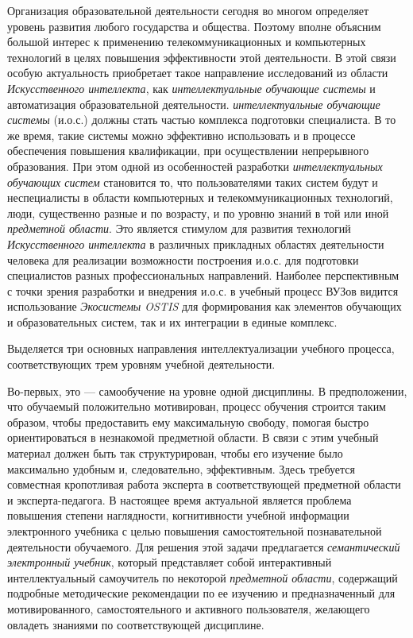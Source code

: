 Организация образовательной деятельности сегодня во многом определяет уровень развития любого государства и общества. Поэтому вполне объясним большой интерес к применению телекоммуникационных и компьютерных технологий в целях повышения эффективности этой деятельности. В этой связи особую актуальность приобретает такое направление исследований из области \textit{Искусственного интеллекта}, как \textit{интеллектуальные обучающие системы} и автоматизация образовательной деятельности. \textit{интеллектуальные обучающие системы} (и.о.с.) должны стать частью комплекса подготовки специалиста. В то же время, такие системы можно эффективно использовать и в процессе обеспечения повышения квалификации, при осуществлении непрерывного образования. При этом одной из особенностей разработки \textit{интеллектуальных обучающих систем} становится то, что пользователями таких систем будут и неспециалисты в области компьютерных и телекоммуникационных технологий, люди, существенно разные и по возрасту, и по уровню знаний в той или иной \textit{предметной области}. Это является стимулом для развития технологий \textit{Искусственного интеллекта} в различных прикладных областях деятельности человека для реализации возможности построения и.о.с. для подготовки специалистов разных профессиональных направлений. Наиболее перспективным с точки зрения разработки и внедрения и.о.с. в учебный процесс ВУЗов видится использование \textit{Экосистемы OSTIS} для формирования как элементов обучающих и образовательных систем, так и их интеграции в единые комплекс.

Выделяется три основных направления интеллектуализации учебного процесса, соответствующих трем уровням учебной деятельности.

Во-первых, это --- самообучение на уровне одной дисциплины. В предположении, что обучаемый положительно мотивирован, процесс обучения строится таким образом, чтобы предоставить ему максимальную свободу, помогая быстро ориентироваться в незнакомой предметной области. В связи с этим учебный материал должен быть так структурирован, чтобы его изучение было максимально удобным и, следовательно, эффективным. Здесь требуется совместная кропотливая работа эксперта в соответствующей предметной области и эксперта-педагога. В настоящее время актуальной является проблема повышения степени наглядности, когнитивности учебной информации электронного учебника с целью повышения самостоятельной познавательной деятельности обучаемого. Для решения этой задачи предлагается \textit{семантический электронный учебник}, который представляет собой интерактивный интеллектуальный самоучитель по некоторой \textit{предметной области}, содержащий подробные методические рекомендации по ее изучению и предназначенный для мотивированного, самостоятельного и активного пользователя, желающего овладеть знаниями по соответствующей дисциплине.

